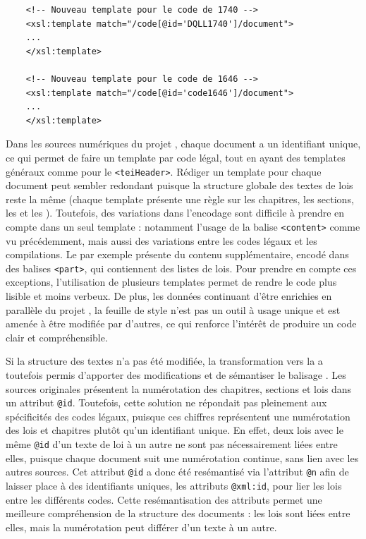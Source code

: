 \begin{verbatim}
    <!-- Nouveau template pour le code de 1740 -->
    <xsl:template match="/code[@id='DQLL1740']/document">
    ...
    </xsl:template>

    <!-- Nouveau template pour le code de 1646 -->
    <xsl:template match="/code[@id='code1646']/document">
    ...
    </xsl:template>
\end{verbatim}
Dans les sources numériques du projet \LSC, chaque document a un identifiant unique, ce qui permet de faire un template par code légal, tout en ayant des templates généraux comme pour le \texttt{<teiHeader>}. Rédiger un template pour chaque document peut sembler redondant puisque la structure globale des textes de lois reste la même (chaque template présente une règle sur les chapitres, les sections, les \lu et les \li). Toutefois, des variations dans l'encodage sont difficile à prendre en compte dans un seul template : notamment l'usage de la balise \texttt{<content>} comme vu précédemment, mais aussi des variations entre les codes légaux et les compilations. Le \huidian par exemple présente du contenu supplémentaire, encodé dans des balises \texttt{<part>}, qui contiennent des listes de lois. Pour prendre en compte ces exceptions, l'utilisation de plusieurs templates permet de rendre le code plus lisible et moins verbeux. De plus, les données \LSC continuant d'être enrichies en parallèle du projet \COREL, la feuille de style n'est pas un outil à usage unique et est amenée à être modifiée par d'autres, ce qui renforce l'intérêt de produire un code clair et compréhensible. 

Si la structure des textes n'a pas été modifiée, la transformation vers la \TEI a toutefois permis d'apporter des modifications et de sémantiser le balisage \XML. Les sources originales présentent la numérotation des chapitres, sections et lois dans un attribut \texttt{@id}. Toutefois, cette solution ne répondait pas pleinement aux spécificités des codes légaux, puisque ces chiffres représentent une numérotation des lois et chapitres plutôt qu'un identifiant unique. En effet, deux lois avec le même \texttt{@id} d'un texte de loi à un autre ne sont pas nécessairement liées entre elles, puisque chaque document suit une numérotation continue, sans lien avec les autres sources. Cet attribut \texttt{@id} a donc été resémantisé via l'attribut \texttt{@n} afin de laisser place à des identifiants uniques, les attributs \texttt{@xml:id}, pour lier les lois entre les différents codes. Cette resémantisation des attributs permet une meilleure compréhension de la structure des documents : les lois sont liées entre elles, mais la numérotation peut différer d'un texte à un autre.

